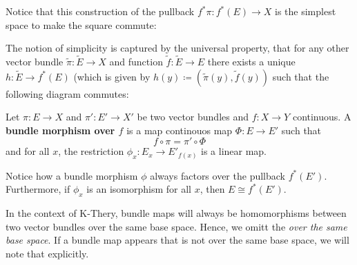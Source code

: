 \begin{remark}\label{rem:vg-pullbackInducesBundleMap}
	Notice that this construction of the pullback $f^*{\pi}:f^*(E) \to X$ is the simplest space to make the square commute: 
\begin{center}
\end{center} The notion of simplicity is captured by the universal property, that for any other vector bundle $\tilde{\pi}:\tilde{E}\to X$ and function $\tilde{f}:\tilde{E}\to E$ there exists a unique $h:\tilde{E}\to f^*(E)$ (which is given by $h(y)\coloneq (\tilde{\pi}(y),\tilde{f}(y))$ such that the following diagram commutes:

\begin{center}
\end{center}
\end{remark}

\begin{definition}
Let $\pi:E\to X$ and $\pi':E'\to X'$ be two vector bundles and $f:X\to Y$ continuous. A \textbf{bundle morphism over $f$} is a map continouos map $\Phi:E\to E'$ such that 
\begin{equation*}
	f\circ \pi=\pi'\circ \Phi
\end{equation*} and for all $x$, the restriction $\phi_x:E_x\to E'_{f(x)}$ is a linear map. 
\end{definition}
\begin{remark}
	Notice how a bundle morphism $\phi$ always factors over the pullback $f^*(E')$. Furthermore, if $\phi_x$ is an isomorphism for all $x$, then $E\cong f^*(E')$.
\end{remark}
\begin{remark}
	In the context of K-Thery, bundle maps will always be homomorphisms between two vector bundles over the same base space. Hence, we omitt the \textit{over the same base space}. If a bundle map appears that is not over the same base space, we will note that explicitly.
\end{remark}

